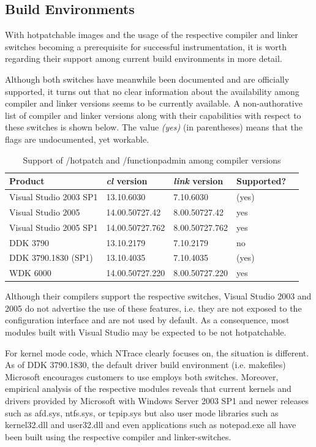 \subsection{Build Environments}
With hotpatchable images and the usage of the respective compiler and linker switches
becoming a prerequisite for successful instrumentation, it is worth regarding 
their support among current build environments in more detail. 

Although both switches have meanwhile been documented and are officially supported,
it turns out that no clear information about the availability among compiler and linker versions
seems to be currently available. A non-authorative list of compiler and linker
versions along with their capabilities with respect to these switches is shown below. 
The value \emph{(yes)} (in parentheses) means that the flags are undocumented, yet workable.

\begin{table}[ht] 
\caption{Support of /hotpatch and /functionpadmin among compiler versions}
\centering          
\begin{tabular}{l l l l l}    
\hline\hline 
Product & \emph{cl} version 	& \emph{link} version		& Supported? \\
\hline
Visual Studio 2003 SP1					&	13.10.6030			& 7.10.6030				& (yes)	\\ 
Visual Studio 2005							& 14.00.50727.42	& 8.00.50727.42		& yes		\\
Visual Studio 2005 SP1					& 14.00.50727.762	& 8.00.50727.762	& yes		\\
\hline
DDK 3790 												& 13.10.2179			& 7.10.2179				& no		\\
DDK 3790.1830 (SP1)							& 13.10.4035			& 7.10.4035				& (yes)	\\ 
WDK 6000												& 14.00.50727.220	& 8.00.50727.220 	& yes		\\ 
\hline
\end{tabular}
\end{table}

Although their compilers support the respective switches, Visual Studio 2003 and 2005 
do not advertise the use of these features, i.e. they are not exposed to the configuration
interface and are not used by default. As a consequence, most modules built with
Visual Studio may be expected to be not hotpatchable.

For kernel mode code, which NTrace clearly focuses on, the situation is different. As of DDK 3790.1830, 
the default driver build environment (i.e. makefiles) Microsoft encourages customers
to use employs both switches. Moreover, empirical analysis of the respective modules
reveals that current kernels and drivers provided by Microsoft with Windows Server 2003 SP1 and newer releases such as
afd.sys, ntfs.sys, or tcpip.sys but also user mode libraries such as kernel32.dll and
user32.dll and even applications such as notepad.exe all have been built using the respective
compiler and linker-switches.


